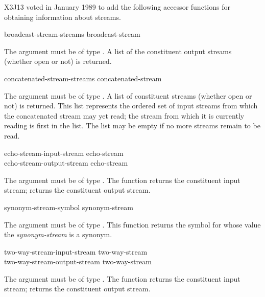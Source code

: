 \begin{new}
X3J13 voted in January 1989
to add the following accessor functions
for obtaining information about streams.


\begin{defun}[Function]
broadcast-stream-streams broadcast-stream

The argument must be of type .
A list of the constituent output streams (whether open or not) is returned.

\end{defun}


\begin{defun}[Function]
concatenated-stream-streams concatenated-stream

The argument must be of type .
A list of constituent streams (whether open or not) is returned.
This list represents the ordered set of input streams from which
the concatenated stream may yet read; the stream from which it is
currently reading is first in the list.  The list may be empty
if no more streams remain to be read.
\end{defun}


\begin{defun}[Function]
echo-stream-input-stream echo-stream \\
echo-stream-output-stream echo-stream

The argument must be of type .
The function  returns the constituent
input stream;  returns the constituent
output stream.
\end{defun}


\begin{defun}[Function]
synonym-stream-symbol synonym-stream

The argument must be of type .  This function returns
the symbol for whose value the \emph{synonym-stream} is a synonym.
\end{defun}


\begin{defun}[Function]
two-way-stream-input-stream two-way-stream \\
two-way-stream-output-stream two-way-stream

The argument must be of type .
The function  returns the constituent
input stream;  returns the constituent
output stream.
\end{defun}
\end{new}

